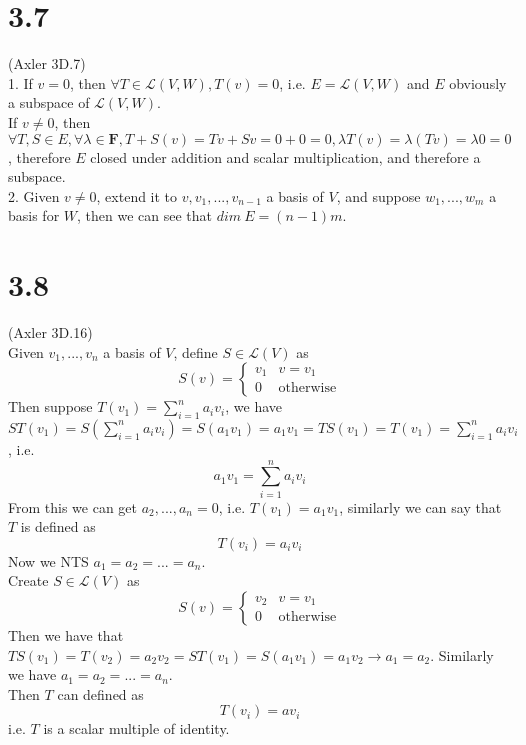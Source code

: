 \documentclass{article}
\begin{document}
\section{3.7}
(Axler 3D.7)\\
1. If $v = 0$, then $\forall T \in \mathcal{L}(V, W), T(v) = 0$, i.e. $E = \mathcal{L}(V, W)$ and $E$ obviously a subspace of $\mathcal{L}(V, W)$.\\
If $v \neq 0$, then $\forall T, S \in E, \forall \lambda \in \mathbf{F}, T+S(v) = Tv + Sv = 0 + 0 = 0, \lambda T(v) = \lambda(Tv) = \lambda 0 = 0$, therefore $E$ closed under addition and scalar multiplication, and therefore a subspace.\\
2. Given $v \neq 0$, extend it to $v, v_1, ..., v_{n-1}$ a basis of $V$, and suppose $w_1, ..., w_m$ a basis for $W$, then we can see that $dim\ E = (n-1)m$.
\section{3.8}
(Axler 3D.16)\\
Given $v_1, ..., v_n$ a basis of $V$, define $S \in \mathcal{L}(V)$ as
\begin{equation*}
    S(v) = \begin{cases}
    v_1 & v = v_1 \\
    0 & \textrm{otherwise}
    \end{cases}
\end{equation*}
Then suppose $T(v_1) = \sum_{i=1}^{n} a_iv_i$, we have $ST(v_1) = S\left(\sum_{i=1}^{n} a_iv_i\right) = S(a_1v_1) = a_1v_1 = TS(v_1) = T(v_1) = \sum_{i=1}^{n} a_iv_i$, i.e.
\begin{equation*}
    a_1v_1 = \sum_{i=1}^{n}a_iv_i
\end{equation*}
From this we can get $a_2, ..., a_n = 0$, i.e. $T(v_1) = a_1v_1$, similarly we can say that $T$ is defined as
\begin{equation*}
    T(v_i) = a_iv_i
\end{equation*}
Now we NTS $a_1 = a_2 = ... = a_n$.\\
Create $S \in \mathcal{L}(V)$ as
\begin{equation*}
    S(v) = \begin{cases}
    v_2 & v = v_1 \\
    0 & \textrm{otherwise}
    \end{cases}
\end{equation*}
Then we have that $TS(v_1) = T(v_2) = a_2v_2 = ST(v_1) = S(a_1v_1) = a_1v_2 \rightarrow a_1 = a_2$. Similarly we have $a_1 = a_2 = ... = a_n$.\\
Then $T$ can defined as
\begin{equation*}
    T(v_i) = av_i
\end{equation*}
i.e. $T$ is a scalar multiple of identity.
\end{document}
